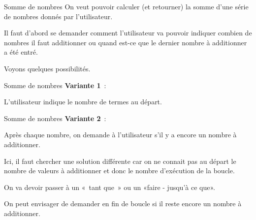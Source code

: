 \begin{frame}{Somme de nombres}
	On veut pouvoir calculer (et retourner)
	la somme d'une série de nombres donnés par
	l'utilisateur. 
	
	\bigskip
	
	Il faut d'abord se
	demander comment l'utilisateur va pouvoir indiquer
	combien de nombres il faut additionner ou quand est-ce que le dernier
	nombre à additionner a été entré. 
	
	\bigskip
	
	Voyons quelques possibilités.
\end{frame}

\begin{frame}{Somme de nombres}
	\textbf{Variante 1}~: 
	
	L'utilisateur indique le nombre de termes au départ.
	
\end{frame}

\begin{frame}{Somme de nombres}
	\textbf{Variante 2}~: 
		
	Après chaque nombre, 
	on demande à l'utilisateur s'il y a encore un nombre à additionner.

	\bigskip
	
	Ici, il faut chercher une solution différente
	car on ne connait pas au départ le nombre de valeurs à additionner et
	donc le nombre d'exécution de la boucle. 
	
	\bigskip
	
	On va devoir passer à un
	«~tant que~» ou un «faire - jusqu'à ce que». 
	
	\bigskip
	
	On peut
	envisager de demander en fin de boucle si il reste
	encore un nombre à additionner. 
\end{frame}

